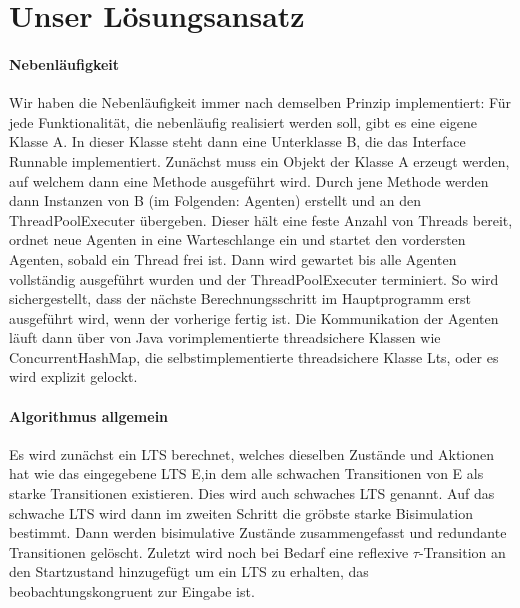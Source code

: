 \documentclass[a4paper]{scrartcl}
\begin{document}
\section*{Unser Lösungsansatz}
\paragraph*{Nebenläufigkeit}
Wir haben die Nebenläufigkeit immer nach demselben Prinzip implementiert:
Für jede Funktionalität, die nebenläufig realisiert werden soll, gibt es eine eigene Klasse A. In dieser Klasse steht dann eine Unterklasse B, die das Interface Runnable implementiert. Zunächst muss ein Objekt der Klasse A erzeugt werden, auf welchem dann eine Methode ausgeführt wird. Durch jene Methode werden dann Instanzen von B (im Folgenden: Agenten) erstellt und an den ThreadPoolExecuter übergeben. Dieser hält eine feste Anzahl von Threads bereit, ordnet neue Agenten in eine Warteschlange ein und startet den vordersten Agenten, sobald ein Thread frei ist.
 Dann wird gewartet bis alle Agenten vollständig ausgeführt wurden und der ThreadPoolExecuter terminiert. So wird sichergestellt, dass der nächste Berechnungsschritt im Hauptprogramm erst ausgeführt wird, wenn der vorherige fertig ist. Die Kommunikation der Agenten läuft dann über von Java vorimplementierte threadsichere Klassen wie ConcurrentHashMap, die selbstimplementierte threadsichere Klasse Lts, oder es wird explizit gelockt.
 
\paragraph*{Algorithmus allgemein}
Es wird zunächst ein LTS berechnet, welches dieselben Zustände und Aktionen hat wie das eingegebene LTS E,in dem alle schwachen Transitionen von E als starke Transitionen existieren. Dies wird auch schwaches LTS genannt. Auf das schwache LTS wird dann im zweiten Schritt die gröbste starke Bisimulation bestimmt. Dann werden bisimulative Zustände zusammengefasst und redundante Transitionen gelöscht. Zuletzt wird noch bei Bedarf eine reflexive $\tau$-Transition an den Startzustand hinzugefügt um ein LTS zu erhalten, das beobachtungskongruent zur Eingabe ist.
\end{document}
